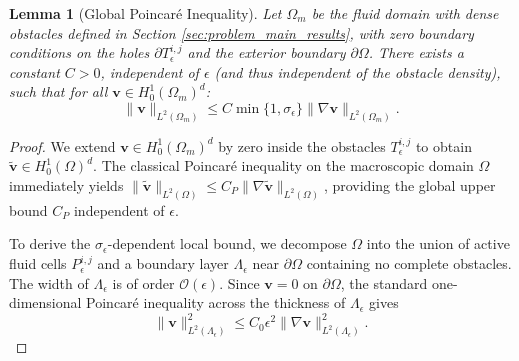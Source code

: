 \documentclass[10pt,a4paper]{amsart}
\newtheorem{lemma}{Lemma}
\begin{document}
\begin{lemma}[Global Poincaré Inequality]\label{lemma:poincare}
    Let $\Omega_m$ be the fluid domain with dense obstacles defined in Section \ref{sec:problem_main_results}, with zero boundary conditions on the holes $\partial T_{\epsilon}^{i,j}$ and the exterior boundary $\partial \Omega$. There exists a constant $C > 0$, independent of $\epsilon$ (and thus independent of the obstacle density), such that for all $\mathbf{v} \in H_0^1(\Omega_m)^d$:
    \begin{equation}
        \|\mathbf{v}\|_{L^2(\Omega_m)} \le C \min\{1, \sigma_{\epsilon}\} \|\nabla \mathbf{v}\|_{L^2(\Omega_m)}.
    \end{equation}
\end{lemma}

\begin{proof}
    We extend $\mathbf{v} \in H_0^1(\Omega_m)^d$ by zero inside the obstacles $T_{\epsilon}^{i,j}$ to obtain $\tilde{\mathbf{v}} \in H_0^1(\Omega)^d$. The classical Poincaré inequality on the macroscopic domain $\Omega$ immediately yields $\|\tilde{\mathbf{v}}\|_{L^2(\Omega)} \le C_P \|\nabla \tilde{\mathbf{v}}\|_{L^2(\Omega)}$, providing the global upper bound $C_P$ independent of $\epsilon$.

    To derive the $\sigma_\epsilon$-dependent local bound, we decompose $\Omega$ into the union of active fluid cells $P_\epsilon^{i,j}$ and a boundary layer $\Lambda_{\epsilon}$ near $\partial \Omega$ containing no complete obstacles. The width of $\Lambda_{\epsilon}$ is of order $\mathcal{O}(\epsilon)$. Since $\mathbf{v} = 0$ on $\partial \Omega$, the standard one-dimensional Poincaré inequality across the thickness of $\Lambda_{\epsilon}$ gives
    \begin{equation}
        \|\mathbf{v}\|_{L^2(\Lambda_{\epsilon})}^2 \le C_0 \epsilon^2 \|\nabla \mathbf{v}\|_{L^2(\Lambda_{\epsilon})}^2.
    \end{equation}


\end{proof}
\end{document}
